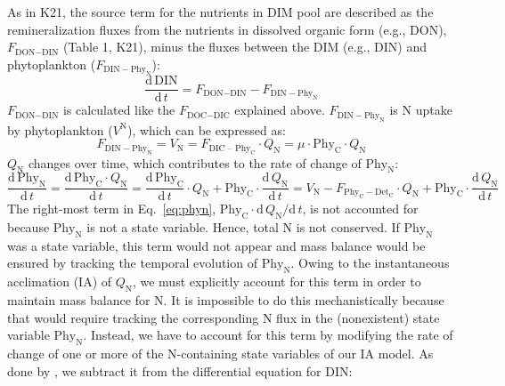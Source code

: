 \documentclass[gmd, manuscript]{copernicus}
\begin{document}
As in K21, the source term for the nutrients in DIM pool are described as the remineralization fluxes from the nutrients in dissolved organic form (e.g., DON), $F_{\text{DON}-\text{DIN}}$ (Table 1, K21), minus the fluxes between the DIM (e.g., DIN) and phytoplankton ($F_{\text{DIN}-\text{Phy}_{\text{N}}}$): 
\begin{equation} \label{eq:sdin}
  \frac{\text{d}\,\text{DIN}}{\text{d}\,t} = F_{\text{DON}-\text{DIN}} - F_{\text{DIN}-\text{Phy}_{\text{N}}}
\end{equation}
$F_{\text{DON}-\text{DIN}}$ is calculated like the $F_{\text{DOC}-\text{DIC}}$ explained above. $F_{\text{DIN}-\text{Phy}_{\text{N}}}$ is N uptake by phytoplankton ($V^{\text{N}}$), which can be expressed as:
\begin{equation} \label{eq:dphyNdt}
  F_{\text{DIN}-\text{Phy}_{\text{N}}} = V_{\text{N}} = F_{\text{DIC -- Phy}_{\text{C}}} \cdot Q_{\text{N}} = \mu \cdot \text{Phy}_{\text{C}} \cdot Q_{\text{N}}
\end{equation}
$Q_{\text{N}}$ changes over time, which contributes to the rate of change of $\text{Phy}_{\text{N}}$:
\begin{equation}
  \label{eq:phyn}
  \frac{\mathrm{d}\,\text{Phy}_{\text{N}}}{\mathrm{d}\,t} = \frac{\mathrm{d}\,\text{Phy}_{\text{C}}\cdot Q_{\text{N}}}{\mathrm{d}\,t}
  = \frac{\mathrm{d}\,\text{Phy}_{\text{C}}}{\mathrm{d}\,t} \cdot Q_{\text{N}} + \text{Phy}_{\text{C}} \cdot \frac{\mathrm{d}\,Q_{\text{N}}}{\mathrm{d}\,t}
  = V_{\text{N}} - F_{\text{Phy}_{\text{C}}-\text{Det}_{\text{C}}}\cdot Q_{\text{N}} + \text{Phy}_{\text{C}} \cdot \frac{\mathrm{d}\,Q_{\text{N}}}{\mathrm{d}\,t}
\end{equation}
The right-most term in Eq.~\eqref{eq:phyn}, $\text{Phy}_{\text{C}}\cdot \mathrm{d}\,Q_{\text{N}} / \mathrm{d}\, t$, is not accounted for because $\text{Phy}_{\text{N}}$ is not a state variable.  Hence, total N is not conserved.  If $\text{Phy}_{\text{N}}$ was a state variable, this term would not appear and mass balance would be ensured by tracking the temporal evolution of $\text{Phy}_{\text{N}}$.  Owing to the instantaneous acclimation (IA) of $Q_{\text{N}}$, we must explicitly account for this term in order to maintain mass balance for N\@.  It is impossible to do this mechanistically because that would require tracking the corresponding N flux in the (nonexistent) state variable $\text{Phy}_{\text{N}}$.  Instead, we have to account for this term by modifying the rate of change of one or more of the N-containing state variables of our IA model.  As done by \citet{Smith2016}, we subtract it from the differential equation for DIN\@:
\end{document}
